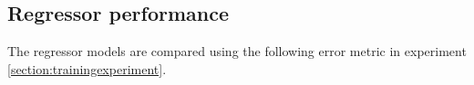 








\subsection{Regressor performance}

The regressor models are compared using the following error metric in experiment \ref{section:trainingexperiment}.

